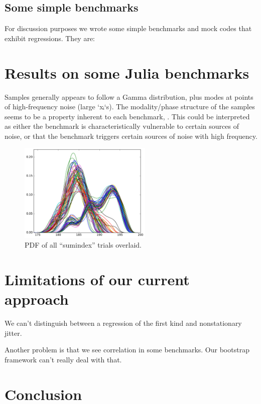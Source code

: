 \documentclass[conference]{IEEEtran}
\begin{document}
\subsection{Some simple benchmarks}

For discussion purposes we wrote some simple benchmarks and mock codes that exhibit regressions. They are:




\section{Results on some Julia benchmarks}

Samples generally appears to follow a Gamma distribution, plus modes at points of high-frequency noise (large `xᵢ`s). The modality/phase structure of the samples seems to be a property inherent to each benchmark, . This could be interpreted as either the benchmark is characteristically vulnerable to certain sources of noise, or that the benchmark triggers certain sources of noise with high frequency.


\begin{figure}[!t]
\centering
{}
\includegraphics[width=2.5in]{figures/fig4/kde_pdf_sumindex}
\caption{PDF of all ``sumindex'' trials overlaid.}
\label{fig:pdfsumindex}
\end{figure}


\section{Limitations of our current approach}

We can't distinguish between a regression of the first kind and nonstationary jitter.

Another problem is that we see correlation in some benchmarks. Our bootstrap framework can't really deal with that.


\section{Conclusion}
\end{document}
